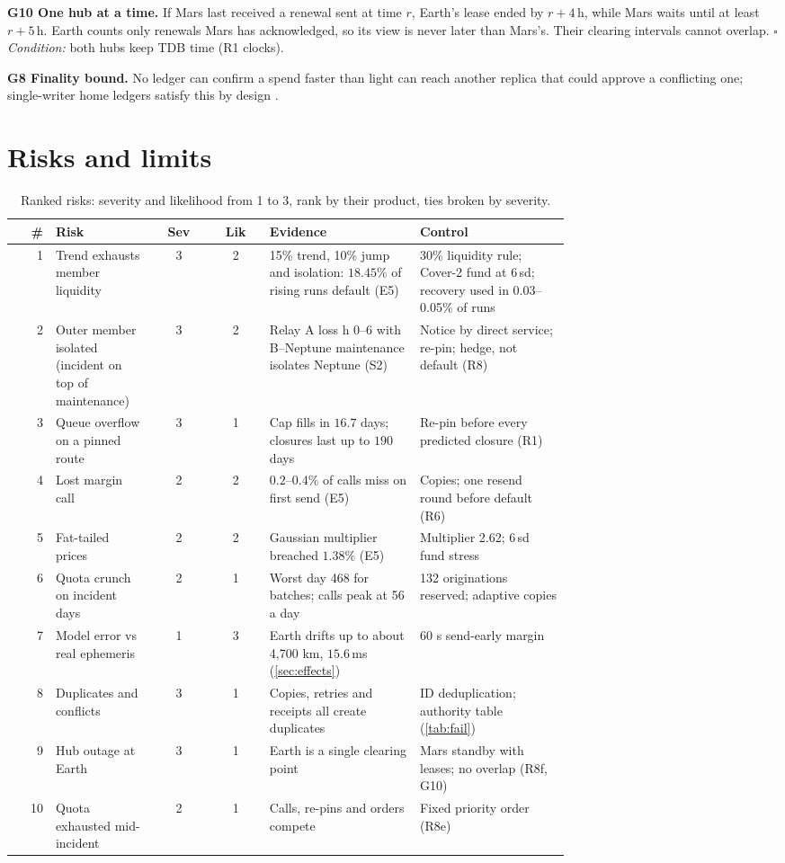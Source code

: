 \documentclass[11pt]{article}
\theoremstyle{definition}
\theoremstyle{remark}
\newcommand{\h}{\,\mathrm{h}}
\begin{document}
\textbf{G10 One hub at a time.} If Mars last received a renewal sent at time $r$, Earth's lease ended by $r+4\h$, while Mars waits until at least $r+5\h$. Earth counts only renewals Mars has acknowledged, so its view is never later than Mars's. Their clearing intervals cannot overlap. $\square$ \emph{Condition:} both hubs keep TDB time (R1 clocks).

\textbf{G8 Finality bound.} No ledger can confirm a spend faster than light can reach another replica that could approve a conflicting one; single-writer home ledgers satisfy this by design \cite{gilbert2002}.

\section{Risks and limits}\label{sec:risk}
\begin{table}[H]
\centering
\caption{Ranked risks: severity and likelihood from 1 to 3, rank by their product, ties broken by severity.}\label{tab:risk}
\small
\begin{tabular}{@{}rp{0.18\linewidth}ccp{0.27\linewidth}p{0.27\linewidth}@{}}
\toprule
\# & Risk & Sev & Lik & Evidence & Control \\
\midrule
1 & Trend exhausts member liquidity & 3 & 2 & 15\% trend, 10\% jump and isolation: $18.45\%$ of rising runs default (E5) & 30\% liquidity rule; Cover-2 fund at 6\,sd; recovery used in 0.03--0.05\% of runs \\
2 & Outer member isolated (incident on top of maintenance) & 3 & 2 & Relay A loss h 0--6 with B--Neptune maintenance isolates Neptune (S2) & Notice by direct service; re-pin; hedge, not default (R8) \\
3 & Queue overflow on a pinned route & 3 & 1 & Cap fills in $16.7$ days; closures last up to $190$ days & Re-pin before every predicted closure (R1) \\
4 & Lost margin call & 2 & 2 & $0.2$--$0.4\%$ of calls miss on first send (E5) & Copies; one resend round before default (R6) \\
5 & Fat-tailed prices & 2 & 2 & Gaussian multiplier breached $1.38\%$ (E5) & Multiplier 2.62; 6\,sd fund stress \\
6 & Quota crunch on incident days & 2 & 1 & Worst day 468 for batches; calls peak at 56 a day & 132 originations reserved; adaptive copies \\
7 & Model error vs real ephemeris & 1 & 3 & Earth drifts up to about 4{,}700 km, $15.6$\,ms (\cref{sec:effects}) & 60 s send-early margin \\
8 & Duplicates and conflicts & 3 & 1 & Copies, retries and receipts all create duplicates & ID deduplication; authority table (\cref{tab:fail}) \\
9 & Hub outage at Earth & 3 & 1 & Earth is a single clearing point & Mars standby with leases; no overlap (R8f, G10) \\
10 & Quota exhausted mid-incident & 2 & 1 & Calls, re-pins and orders compete & Fixed priority order (R8e) \\
\bottomrule
\end{tabular}
\end{table}
\end{document}
